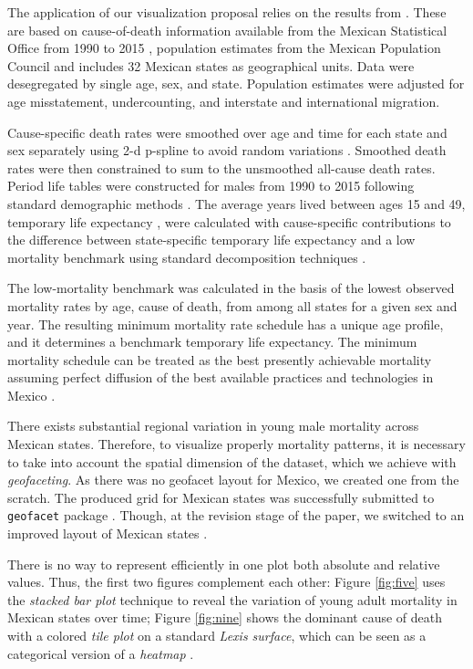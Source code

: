 \documentclass[10pt, twoside, parskip=half]{article}
\begin{document}
The application of our visualization proposal relies on the results from \citet{aburto2018bo}. These are based on cause-of-death information available from the Mexican Statistical Office from 1990 to 2015 \citep{INEGI}, population estimates from the Mexican Population Council and includes 32 Mexican states as geographical units. Data were desegregated by single age, sex, and state. Population estimates were adjusted for age misstatement, undercounting, and interstate and international migration.

Cause-specific death rates were smoothed over age and time for each state and sex separately using 2-d p-spline to avoid random variations \citep{camarda2012jss}. Smoothed death rates were then constrained to sum to the unsmoothed all-cause death rates. Period life tables were constructed for males from 1990 to 2015 following standard demographic methods \citep[Chapter 3]{preston2001}. The average years lived between ages 15 and 49, temporary life expectancy \citep{arriaga1984d}, were calculated with cause-specific contributions to the difference between state-specific temporary life expectancy and a low mortality benchmark using standard decomposition techniques \citep{horiuchi2008d}.

The low-mortality benchmark was calculated in the basis of the lowest observed mortality rates by age, cause of death, from among all states for a given sex and year. The resulting minimum mortality rate schedule has a unique age profile, and it determines a benchmark temporary life expectancy. The minimum mortality schedule can be treated as the best presently achievable mortality assuming perfect diffusion of the best available practices and technologies in Mexico \citep{vallin2008p, canudas-romo2019naaj}.

There exists substantial regional variation in young male mortality across Mexican states. Therefore, to visualize properly mortality patterns, it is necessary to take into account the spatial dimension of the dataset, which we achieve with \emph{geofaceting}. As there was no geofacet layout for Mexico, we created one from the scratch. The produced grid for Mexican states was successfully submitted to \texttt{geofacet} package \citep{kashnitsky2017ga}. Though, at the revision stage of the paper, we switched to an improved layout of Mexican states \citep{zepeda2018g}.

There is no way to represent efficiently in one plot both absolute and relative values. Thus, the first two figures complement each other: Figure \ref{fig:five} uses the \emph{stacked bar plot} technique to reveal the variation of young adult mortality in Mexican states over time; Figure \ref{fig:nine} shows the dominant cause of death with a colored \emph{tile plot} on a standard \emph{Lexis surface}, which can be seen as a categorical version of a \emph{heatmap} \citep{scholey2017dr, rau2018}.
\end{document}
